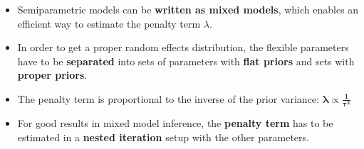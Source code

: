 \documentclass[12pt]{article}
\begin{document}
\begin{itemize}
\item Semiparametric models can be \textbf{written as mixed models}, which enables an efficient way to estimate the penalty term $\lambda$.
\item In order to get a proper random effects distribution, the flexible parameters have to be \textbf{separated} into sets of parameters with \textbf{flat priors} and sets with \textbf{proper priors}.
\item The penalty term  is proportional to the inverse of the prior variance: $\mathbf{\boldsymbol{\lambda} \boldsymbol{\propto} \frac{1}{\boldsymbol{\tau}^2}}$
\item For good results in mixed model inference, the \textbf{penalty term} has to be estimated in a \textbf{nested iteration} setup with the other parameters.
\end{itemize}


\newpage
\printbibliography
\end{document}
